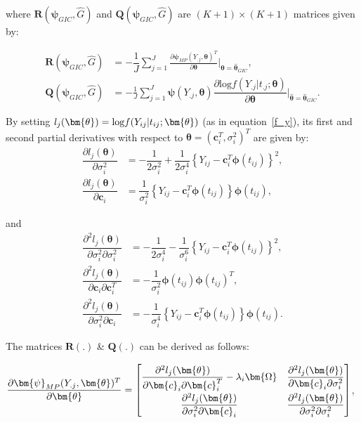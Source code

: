where $\bm{R}(\bm{\psi}_{GIC},\hat{G})$ and $\bm{Q}(\bm{\psi}_{GIC},\hat{G})$ are $(K+1) \times (K+1)$ matrices given by:

\begin{align}\label{R_Q_eq}
\bm{R}(\bm{\psi}_{GIC},\hat{G})&=-\dfrac{1}{J}\sum_{j=1}^{J}\frac{\partial \bm{\psi}_{MP}(Y_{.j},\bm{\theta})^T}{\partial \bm{\theta}}\bigg|_{\bm{\hat{\theta}} = \bm{\hat{\theta}}_{GIC}}, \\
\bm{Q}(\bm{\psi}_{GIC},\hat{G})&=-\frac{1}{J}\sum_{j=1}^{J}\bm{\psi}(Y_{.j},\bm{\theta})\dfrac{\partial \text{log}f(Y_{.j}|t_{.j};\bm{\theta})}{\partial \bm{\theta}}\bigg|_{\bm{\hat{\theta}} = \bm{\hat{\theta}}_{GIC}}.
\end{align}

By setting $\text{\textit{l}}_j(\bm{\theta})=\text{log}f(Y_{ij}|t_{ij};\bm{\theta})$ (as in equation~\eqref{f_y}), its first and second partial derivatives with respect to $\bm{\theta} = \left(\bm{c}_i^T,\sigma_i^2\right)^T$ are given by:
\begin{align}
\dfrac{\partial l_j(\bm{\theta})}{\partial \sigma_i^2}&=-\dfrac{1}{2\sigma^2_i}+\dfrac{1}{2\sigma^4_i}\left\{Y_{ij}-\bm{c}_i^T\bm{\phi}(t_{ij})\right\}^2,\nonumber \\
\dfrac{\partial l_j(\bm{\theta})}{\partial \bm{c}_i}&=\dfrac{1}{\sigma_i^2}\left\{Y_{ij}-\bm{c}_i^T\bm{\phi}(t_{ij})\right\}\bm{\phi}(t_{ij}),
\end{align}

and
\begin{align}
\dfrac{\partial^2 l_j(\bm{\theta})}{\partial \sigma_i^2\partial \sigma_i^2}&=-\dfrac{1}{2\sigma^4_i}-\dfrac{1}{\sigma^6_i}\left\{Y_{ij}-\bm{c}_i^T\bm{\phi}(t_{ij})\right\}^2,\nonumber \\
\dfrac{\partial^2 l_j(\bm{\theta})}{\partial \bm{c}_i\partial \bm{c}^T_i}&=-\dfrac{1}{\sigma_i^2}\bm{\phi}(t_{ij})\bm{\phi}(t_{ij})^T, \nonumber \\
\dfrac{\partial^2 l_j(\bm{\theta})}{\partial \sigma_i^2\partial \bm{c}_i}&=-\dfrac{1}{\sigma_i^4}\left\{Y_{ij}-\bm{c}_i^T\bm{\phi}(t_{ij})\right\}\bm{\phi}(t_{ij}).
\end{align}

The matrices $\bm{R}(.)$ \& $\bm{Q}(.)$ can be derived as follows:

\begin{center}
$\dfrac{\partial \bm{\psi}_{MP}(Y_{.j},\bm{\theta})^T}{\partial \bm{\theta}}=\def\arraystretch{2}
\begin{bmatrix}
\dfrac{\partial^2 l_j(\bm{\theta})}{\partial \bm{c}_i \partial \bm{c}_i^T} - \lambda_i \bm{\Omega} & \dfrac{\partial^2 l_j(\bm{\theta})}{\partial \bm{c}_i \partial \sigma_i^2} \\
\dfrac{\partial^2 l_j(\bm{\theta})}{ \partial \sigma_i^2 \partial \bm{c}_i} & \dfrac{\partial^2 l_j(\bm{\theta})}{\partial \sigma_i^2 \partial \sigma_i^2}
\end{bmatrix}$,
\end{center}

